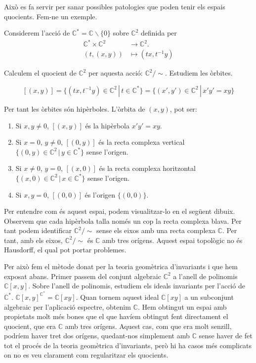 \documentclass{article}
\theoremstyle{definition}
\begin{document}
Aix\`{o} es fa servir per sanar possibles patologies que poden tenir els espais quocients. Fem-ne un exemple.

Considerem l'acci\'{o} de $\mathbb{C}^*=\mathbb{C}\backslash\{0\}$ sobre $\mathbb{C}^2$ definida per
\begin{align*}
\mathbb{C}^*\times\mathbb{C}^2&\longrightarrow\mathbb{C}^2.\\
(t,(x,y))&\longmapsto(tx,t^{-1}y)
\end{align*}

Calculem el quocient de $\mathbb{C}^2$ per aquesta acci\'{o}: $\mathbb{C}^2/\sim$. Estudiem les \`{o}rbites.

\[[(x,y)]=\{(tx,t^{-1}y)\in\mathbb{C}^2\,|\,t\in\mathbb{C}^*\}=\{(x',y')\in\mathbb{C}^2\,|\,x'y'=xy\}\]

Per tant les \`{o}rbites s\'{o}n hip\`{e}rboles. L'\`{o}rbita de $(x,y)$, pot ser:
\begin{enumerate}
\item Si $x,y\neq0$, $[(x,y)]$ \'{e}s la hip\`{e}rbola $x'y'=xy$.
\item Si $x=0$, $y\neq0$, $[(0,y)]$ \'{e}s la recta complexa vertical $\{(0,y)\in\mathbb{C}^2\,|\,y\in\mathbb{C}^*\}$ sense l'origen.
\item Si $x\neq0$, $y=0$, $[(x,0)]$ \'{e}s la recta complexa horitzontal $\{(x,0)\in\mathbb{C}^2\,|\,x\in\mathbb{C}^*\}$ sense l'origen.
\item Si $x,y=0$, $[(0,0)]$ \'{e}s l'origen $\{(0,0)\}$.
\end{enumerate}

Per entendre com \'{e}s aquest espai, podem visualitzar-lo en el seg\"{u}ent dibuix. Observem que cada hip\`{e}rbola talla nom\'{e}s un cop la recta complexa blava. Per tant podem identificar $\mathbb{C}^2/\sim$ sense els eixos amb una recta complexa $\mathbb{C}$. Per tant, amb els eixos, $\mathbb{C}^2/\sim$ \'{e}s $\mathbb{C}$ amb tres or\'{i}gens. Aquest espai topol\`{o}gic no \'{e}s Hausdorff, el qual pot portar problemes.

Per aix\`{o} fem el m\`{e}tode donat per la teoria geom\`{e}trica d'invariants i que hem exposat abans. Primer passem del conjunt algebraic $\mathbb{C}^2$ a l'anell de polinomis $\mathbb{C}[x,y]$. Sobre l'anell de polinomis, estudiem els ideals invariants per l'acci\'{o} de $\mathbb{C}^*$. $\mathbb{C}[x,y]^{\mathbb{C}^*}=\mathbb{C}[xy]$. Quan tornem aquest ideal $\mathbb{C}[xy]$ a un subconjunt algebraic per l'aplicaci\'{o} espectre, obtenim $\mathbb{C}$. Hem obtingut un espai amb propietats molt m\'{e}s bones que el que hav\'{i}em obtingut fent directament el quocient, que era $\mathbb{C}$ amb tres or\'{i}gens. Aquest cas, com que era molt senzill, podr\'{i}em haver tret dos or\'{i}gens, quedant-nos simplement amb $\mathbb{C}$ sense haver de fet tot el proc\'{e}s de la teoria geom\`{e}trica d'invariants, per\`{o} hi ha casos m\'{e}s complicats on no es veu clarament com regularitzar els quocients.
\end{document}
